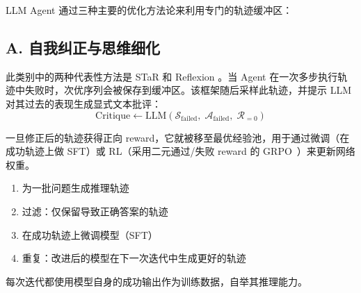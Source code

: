 LLM Agent 通过三种主要的优化方法论来利用专门的轨迹缓冲区：

\subsection{A. 自我纠正与思维细化}
\label{a.-self-correction-and-thought-refinement-star-reflexion}

此类别中的两种代表性方法是 STaR \cite{zelikman2022star} 和 Reflexion \cite{shinn2023reflexion}。当 Agent 在一次多步执行轨迹中失败时，次优序列会被保存到缓冲区。该框架随后采样此轨迹，并提示 LLM 对其过去的表现生成显式文本批评：
\begin{equation}
\text{Critique} \leftarrow \text{LLM}(\mathcal{S}_{\text{failed}},\; \mathcal{A}_{\text{failed}},\; \mathcal{R}_{=0})
\end{equation}

一旦修正后的轨迹获得正向 reward，它就被移至最优经验池，用于通过微调（在成功轨迹上做 SFT）或 RL（采用二元通过/失败 reward 的 GRPO~\cite{shao2024deepseekmath}）来更新网络权重。

\begin{keybox}
\begin{enumerate}
  \item 为一批问题生成推理轨迹
  \item 过滤：仅保留导致正确答案的轨迹
  \item 在成功轨迹上微调模型（SFT）
  \item 重复：改进后的模型在下一次迭代中生成更好的轨迹
\end{enumerate}

每次迭代都使用模型自身的成功输出作为训练数据，自举其推理能力。
\end{keybox}

